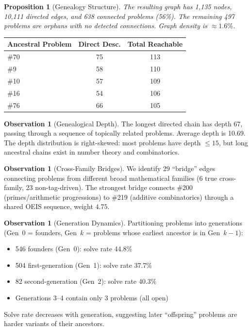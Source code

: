 \documentclass[11pt,a4paper]{article}
\newtheorem{proposition}[theorem]{Proposition}
\theoremstyle{definition}
\newtheorem{observation}[theorem]{Observation}
\theoremstyle{remark}
\begin{document}
\begin{proposition}[Genealogy Structure]
The resulting graph has 1,135 nodes, 10,111 directed edges, and 638 connected
problems (56\%). The remaining 497 problems are orphans with no detected
connections. Graph density is $\approx 1.6\%$.
\end{proposition}

\begin{center}
\begin{tabular}{lcc}
\toprule
Ancestral Problem & Direct Desc. & Total Reachable \\
\midrule
\#70 & 75 & 113 \\
\#9  & 58 & 110 \\
\#10 & 57 & 109 \\
\#16 & 54 & 106 \\
\#76 & 66 & 105 \\
\bottomrule
\end{tabular}
\end{center}

\begin{observation}[Genealogical Depth]
The longest directed chain has depth 67, passing through a sequence of
topically related problems. Average depth is 10.69. The depth distribution
is right-skewed: most problems have depth $\leq 15$, but long ancestral
chains exist in number theory and combinatorics.
\end{observation}

\begin{observation}[Cross-Family Bridges]
We identify 29 ``bridge'' edges connecting problems from different broad
mathematical families (6 true cross-family, 23 non-tag-driven). The strongest
bridge connects \#200 (primes/arithmetic progressions) to \#219 (additive
combinatorics) through a shared OEIS sequence, weight $4.75$.
\end{observation}

\begin{observation}[Generation Dynamics]
Partitioning problems into generations (Gen~0 = founders, Gen~$k$ = problems
whose earliest ancestor is in Gen~$k{-}1$):
\begin{itemize}[nosep]
\item 546 founders (Gen~0): solve rate 44.8\%
\item 504 first-generation (Gen~1): solve rate 37.7\%
\item 82 second-generation (Gen~2): solve rate 40.3\%
\item Generations 3--4 contain only 3 problems (all open)
\end{itemize}
Solve rate decreases with generation, suggesting later ``offspring'' problems
are harder variants of their ancestors.
\end{observation}
\end{document}
